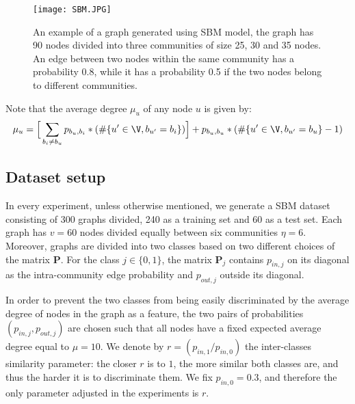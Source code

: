 \begin{figure}[H]
\centering
\texttt{[image: SBM.JPG]}
\caption[Visualization of an SBM-based graph example]{An example of a graph generated using SBM model, the graph has 90 nodes divided into three communities of size 25, 30 and 35 nodes. An edge between two nodes within the same community has a probability 0.8, while it has a probability 0.5 if the two nodes belong to different communities.}
\label{fig:SBM_example}
\end{figure}

Note that the average degree $\mu_u$ of any node $u$ is given by:
\begin{equation}
    \mu_u=\Big[\sum_{b_i\neq b_u} p_{b_u,b_i}*(\#\{ u'\in \V, b_{u'}=b_i \} )\Big]+p_{b_u,b_u}*(\#\{u'\in \V, b_{u'}=b_u \}-1 )
\end{equation}

\subsection{Dataset setup}

In every experiment, unless otherwise mentioned, we generate a SBM dataset consisting of 300 graphs divided, 240 as a training set and 60 as a test set. Each graph has $v=60$ nodes divided equally between six communities $\eta=6$. Moreover, graphs are divided into two classes based on two different choices of the matrix $\mathbf{P}$. For the class $j\in\{0,1\}$, the matrix $\mathbf{P}_j$ contains $p_{in,j}$ on its diagonal as the intra-community edge probability and $p_{out,j}$ outside its diagonal.

In order to prevent the two classes from being easily discriminated by the average degree of nodes in the graph as a feature, the two pairs of probabilities $(p_{in,j}, p_{out,j})$ are chosen such that all nodes have a fixed expected average degree equal to $\mu=10$. We denote by $r=(p_{in,1}/p_{in,0})$ the inter-classes similarity parameter: the closer $r$ is to $1$, the more similar both classes are, and thus the harder it is to discriminate them. We fix $p_{in,0} = 0.3$, and therefore the only parameter adjusted in the experiments is $r$.

